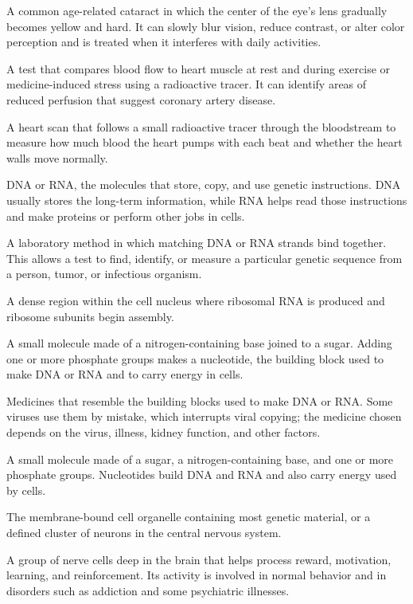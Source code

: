  A common age-related cataract in which the center of the eye’s lens gradually becomes yellow and hard. It can slowly blur vision, reduce contrast, or alter color perception and is treated when it interferes with daily activities.

 A test that compares blood flow to heart muscle at rest and during exercise or medicine-induced stress using a radioactive tracer. It can identify areas of reduced perfusion that suggest coronary artery disease.


 A heart scan that follows a small radioactive tracer through the bloodstream to measure how much blood the heart pumps with each beat and whether the heart walls move normally.

 DNA or RNA, the molecules that store, copy, and use genetic instructions. DNA usually stores the long-term information, while RNA helps read those instructions and make proteins or perform other jobs in cells.

 A laboratory method in which matching DNA or RNA strands bind together. This allows a test to find, identify, or measure a particular genetic sequence from a person, tumor, or infectious organism.

 A dense region within the cell nucleus where ribosomal RNA is produced and ribosome subunits begin assembly.

 A small molecule made of a nitrogen-containing base joined to a sugar. Adding one or more phosphate groups makes a nucleotide, the building block used to make DNA or RNA and to carry energy in cells.

 Medicines that resemble the building blocks used to make DNA or RNA. Some viruses use them by mistake, which interrupts viral copying; the medicine chosen depends on the virus, illness, kidney function, and other factors.

 A small molecule made of a sugar, a nitrogen-containing base, and one or more phosphate groups. Nucleotides build DNA and RNA and also carry energy used by cells.

 The membrane-bound cell organelle containing most genetic material, or a defined cluster of neurons in the central nervous system.

 A group of nerve cells deep in the brain that helps process reward, motivation, learning, and reinforcement. Its activity is involved in normal behavior and in disorders such as addiction and some psychiatric illnesses.

